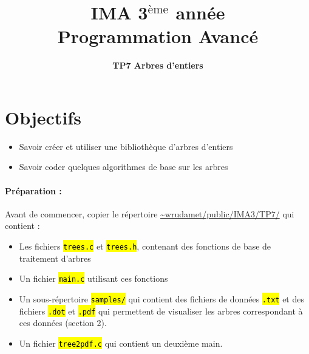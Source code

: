\documentclass[final, pdftex, a4paper, openbib, ]{article}
\title{IMA 3$^{\mbox{\`eme}}$ année\\ Programmation Avancé
}
\author{\huge \textbf{TP7 Arbres d'entiers}}
\date{}
\let\OldTexttt\texttt
\renewcommand{\texttt}[1]{\OldTexttt{\hl{#1}}}
\begin{document}
\setlength{\droptitle}{-90pt}
\maketitle

\vspace{-2.1cm}
\section{Objectifs}

\begin{itemize}
	\item Savoir créer et utiliser une bibliothèque d'arbres d'entiers
	\item Savoir coder quelques algorithmes de base sur les arbres
\end{itemize}


\paragraph{Préparation : } Avant de commencer, copier le répertoire \url{~wrudamet/public/IMA3/TP7/} qui contient :

\begin{itemize}
	\item Les fichiers \texttt{trees.c} et \texttt{trees.h}, contenant des fonctions de base de traitement d'arbres
	\item Un fichier \texttt{main.c} utilisant ces fonctions
	\item Un sous-répertoire \texttt{samples/} qui contient des fichiers de données \texttt{.txt} et des fichiers \texttt{.dot} et \texttt{.pdf} qui permettent de visualiser les arbres correspondant à ces données (section 2).
	\item Un fichier \texttt{tree2pdf.c} qui contient un deuxième main.
\end{itemize}
\end{document}
